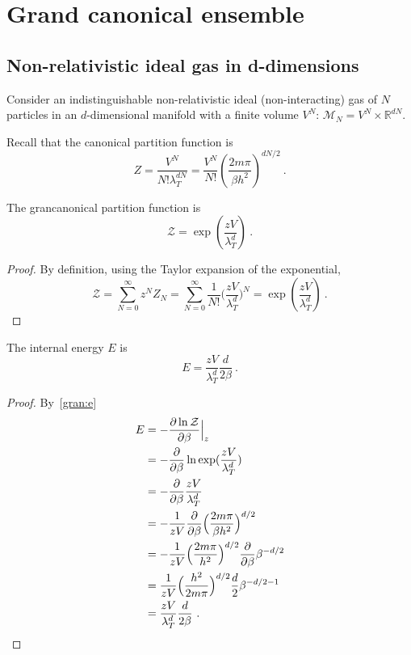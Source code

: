 \chapter{Grand canonical ensemble}

\section{Non-relativistic ideal gas in d-dimensions}

    Consider an indistinguishable non-relativistic ideal (non-interacting) gas of $N$ particles in an $d$-dimensional manifold with a finite volume $V^N$: $\mathcal M_N = V^N \times \mathbb R^{dN}$. 

    Recall that the canonical partition function is
    \begin{equation*}
        Z = \frac{V^N}{N! \lambda^{dN}_T} = \frac{V^N}{N!} (\frac{2 m \pi}{\beta h^2})^{dN/2} ~.
    \end{equation*}

    The grancanonical partition function is 
    \begin{equation*}
        \mathcal Z = \exp(\frac{z V}{\lambda_T^d}) ~.
     \end{equation*}
    \begin{proof}
        By definition, using the Taylor expansion of the exponential,
        \begin{equation*}
            \mathcal Z = \sum_{N=0}^\infty z^N Z_N = \sum_{N=0}^\infty \frac{1}{N!} \Big ( \frac{z V}{\lambda_T^d} \Big)^N = \exp(\frac{z V}{\lambda_T^d}) ~.
        \end{equation*}
    \end{proof}
    
    The internal energy $E$ is 
    \begin{equation*}
        E = \frac{z V}{\lambda^d_T} \frac{d}{2 \beta} ~.
    \end{equation*}
    \begin{proof}
        By~\eqref{gran:e}
        \begin{equation*}
        \begin{aligned}
            E & = - \frac{\partial\ln \mathcal Z}{\partial\beta} \Big \vert_z \\ & = - \frac{\partial}{\partial\beta} \ln \exp(\frac{z V}{\lambda_T^d}) \\ & = - \frac{\partial}{\partial\beta} \frac{z V}{\lambda^d_T} \\ & = - \frac{1}{zV} \frac{\partial}{\partial\beta} \Big ( \frac{2 m \pi} {\beta h^2} \Big )^{d/2} \\ & = - \frac{1}{z V} \Big ( \frac{2 m \pi}{h^2} \Big )^{d/2} \frac{\partial}{\partial\beta} \beta^{-d/2} \\ & = \frac{1}{zV} \Big ( \frac{h^2}{2 m \pi} \Big )^{d/2} \frac{d}{2} \beta^{-d/2 - 1} \\ & = \frac{z V}{\lambda^d_T} \frac{d}{2 \beta} ~.
        \end{aligned}
        \end{equation*}
    \end{proof}
    
